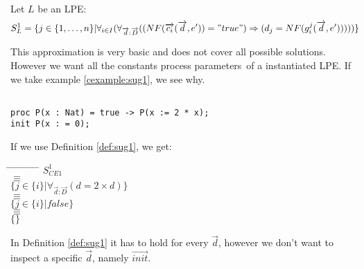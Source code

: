 \documentclass[a4paper,10pt]{article}
\theoremstyle{plain}
\theoremstyle{definition}
\newcommand{\lpe}{linear process equation}
\newcommand{\ovr}{\overrightarrow}
\newcommand{\pp}{process parameter}
\newcommand{\pps}{process parameters}
\begin{document}
\begin{defn} \label{def:sug1} Let $L$ be an LPE:
\begin{displaymath}
S_L^1 =
\lbrace   
j \in \lbrace 1, \ldots , n \rbrace \vert \forall_{i\in I} (\forall_{\ovr{d}: \ovr{D}}((NF(\ovr{c_i}(\ovr{d},e')) = "true")  \Rightarrow (d_j = NF(g_i^j(\ovr{d},e')))))\rbrace
\end{displaymath}

 
This approximation is very basic and does not cover all possible solutions. However we want all
the constants \pps\ of a instantiated LPE. If we take example
\ref{cexample:sug1}, we see why.
\begin{example}[Let $CE1$ be] \label{cexample:sug1}\begin{verbatim}

proc P(x : Nat) = true -> P(x := 2 * x);
init P(x : = 0);

\end{verbatim}
\end{example}

If we use Definition \ref{def:sug1}, we get:\\
\begin{tabbing}
\hspace*{5.mm} \= \hspace*{5.mm} \= \hspace*{5.mm} \= \hspace*{5.mm} \= \hspace*{5.mm} \= \hspace*{5.mm}  \= \hspace*{5.mm}  \= \hspace*{5.mm}  \= \hspace*{5.mm} \= \hspace*{5.mm} \= \hspace*{5.mm}\kill
\> \> $S_{CE1}^1$\\
\> $\equiv$\\
\> \> $\lbrace j \in \lbrace i \rbrace \vert \forall_{\ovr{d}:\ovr{D}}(d = 2 \times d ) \rbrace $\\
\> $\equiv$ \\
\> \> $\lbrace j \in \lbrace i \rbrace \vert false \rbrace $\\
\> $\equiv$ \\
\> \> $\lbrace  \rbrace$\\
\end{tabbing}
In Definition \ref{def:sug1} it has to hold for every $\ovr{d}$, however
we don't want to inspect a specific $\ovr{d}$, namely $\ovr{init}$.
\end{defn}
\end{document}
